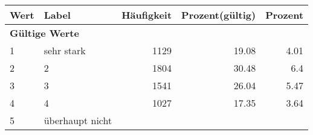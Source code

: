      \begin{longtable}{lXrrr}
     \toprule
     \textbf{Wert} & \textbf{Label} & \textbf{Häufigkeit} & \textbf{Prozent(gültig)} & \textbf{Prozent} \\
     \endhead
     \midrule
     \multicolumn{5}{l}{\textbf{Gültige Werte}}\\

     1 &
     \multicolumn{1}{X}{ sehr stark   } &


       \num{1129} &
       \num[round-mode=places,round-precision=2]{19.08} &
         \num[round-mode=places,round-precision=2]{4.01} \\

     2 &
     \multicolumn{1}{X}{ 2   } &


       \num{1804} &
       \num[round-mode=places,round-precision=2]{30.48} &
         \num[round-mode=places,round-precision=2]{6.4} \\

     3 &
     \multicolumn{1}{X}{ 3   } &


       \num{1541} &
       \num[round-mode=places,round-precision=2]{26.04} &
         \num[round-mode=places,round-precision=2]{5.47} \\

     4 &
     \multicolumn{1}{X}{ 4   } &


       \num{1027} &
       \num[round-mode=places,round-precision=2]{17.35} &
         \num[round-mode=places,round-precision=2]{3.64} \\

     5 &
     \multicolumn{1}{X}{ überhaupt nicht   } &



\end{longtable}
